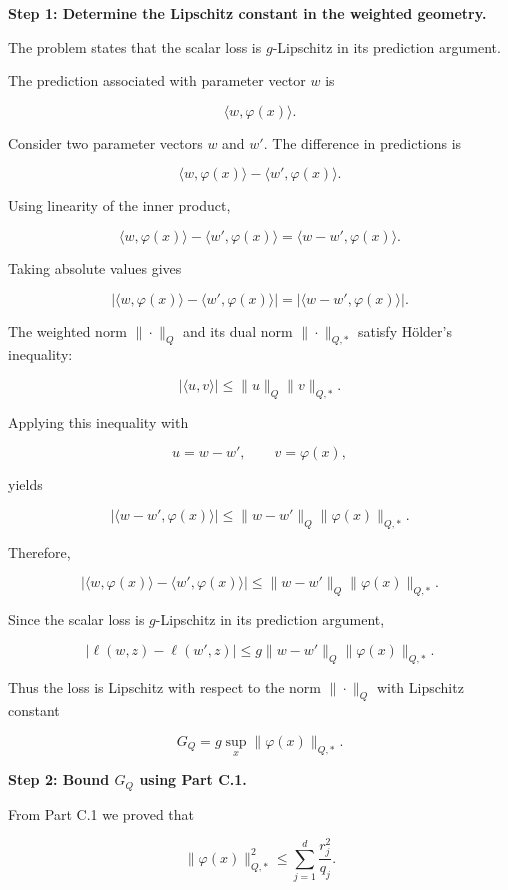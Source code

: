 \documentclass[11pt]{article}
\begin{document}
\begin{enumerate}
\begin{solutionbox}
\medskip

\textbf{Step 1: Determine the Lipschitz constant in the weighted geometry.}

The problem states that the scalar loss is \(g\)-Lipschitz in its prediction argument.

The prediction associated with parameter vector \(w\) is

\[
\langle w,\varphi(x)\rangle.
\]

Consider two parameter vectors \(w\) and \(w'\). The difference in predictions is

\[
\langle w,\varphi(x)\rangle
-
\langle w',\varphi(x)\rangle.
\]

Using linearity of the inner product,

\[
\langle w,\varphi(x)\rangle
-
\langle w',\varphi(x)\rangle
=
\langle w-w',\varphi(x)\rangle.
\]

Taking absolute values gives

\[
\left|
\langle w,\varphi(x)\rangle
-
\langle w',\varphi(x)\rangle
\right|
=
\left|
\langle w-w',\varphi(x)\rangle
\right|.
\]

The weighted norm \(\|\cdot\|_Q\) and its dual norm \(\|\cdot\|_{Q,*}\) satisfy Hölder's inequality:

\[
|\langle u,v\rangle|
\le
\|u\|_Q\|v\|_{Q,*}.
\]

Applying this inequality with

\[
u=w-w',
\qquad
v=\varphi(x),
\]

yields

\[
|\langle w-w',\varphi(x)\rangle|
\le
\|w-w'\|_Q
\|\varphi(x)\|_{Q,*}.
\]

Therefore,

\[
\left|
\langle w,\varphi(x)\rangle
-
\langle w',\varphi(x)\rangle
\right|
\le
\|w-w'\|_Q
\|\varphi(x)\|_{Q,*}.
\]

Since the scalar loss is \(g\)-Lipschitz in its prediction argument,

\[
|\ell(w,z)-\ell(w',z)|
\le
g
\|w-w'\|_Q
\|\varphi(x)\|_{Q,*}.
\]

Thus the loss is Lipschitz with respect to the norm \(\|\cdot\|_Q\) with Lipschitz constant

\[
G_Q
=
g
\sup_x
\|\varphi(x)\|_{Q,*}.
\]

\medskip

\textbf{Step 2: Bound \(G_Q\) using Part C.1.}

From Part C.1 we proved that

\[
\|\varphi(x)\|_{Q,*}^2
\le
\sum_{j=1}^{d}
\frac{r_j^2}{q_j}.
\]


\end{solutionbox}
\end{enumerate}
\end{document}
